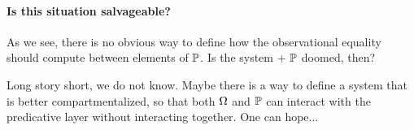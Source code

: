 \paragraph{Is this situation salvageable?}
% 
As we see, there is no obvious way to define how the observational equality 
should compute between elements of \( \mathbb{P} \). 
% 
Is the system \SetoidCC + \( \mathbb{P} \) doomed, then?

Long story short, we do not know. Maybe there is a way to define a system that
is better compartmentalized, so that both \( \Omega \) and \( \mathbb{P} \) can 
interact with the predicative layer without interacting together. 
One can hope...